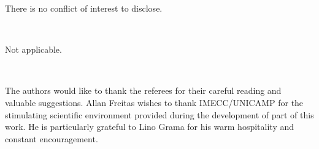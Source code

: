 \documentclass{amsart}
\numberwithin{equation}{section}
\begin{document}
	
	
	 There is no conflict of interest to disclose.
	
	\
	
	
 Not applicable.
	
	\
	
 The authors would like to thank the referees for their careful reading and valuable suggestions. Allan Freitas wishes to thank IMECC/UNICAMP for the stimulating scientific environment provided during the development of part of this work. He is particularly grateful to Lino Grama for his warm hospitality and constant encouragement.
	
	
	
	
	
	
	
\end{document}
